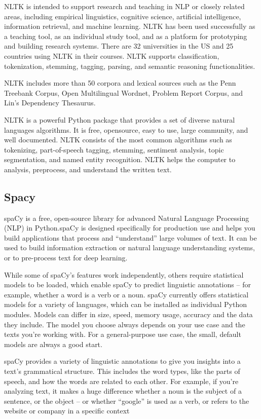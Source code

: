 \documentclass[12pt,a4paper,final]{extreport}
\begin{document}
NLTK is intended to support research and teaching in NLP or closely related areas, including empirical linguistics, cognitive science, artificial intelligence, information retrieval, and machine learning. NLTK has been used successfully as a teaching tool, as an individual study tool, and as a platform for prototyping and building research systems. There are 32 universities in the US and 25 countries using NLTK in their courses. NLTK supports classification, tokenization, stemming, tagging, parsing, and semantic reasoning functionalities. 

NLTK includes more than 50 corpora and lexical sources such as the Penn Treebank Corpus, Open Multilingual Wordnet, Problem Report Corpus, and Lin’s Dependency Thesaurus.

NLTK is a powerful Python package that provides a set of diverse natural languages algorithms. It is free, opensource, easy to use, large community, and well documented. NLTK consists of the most common algorithms such as tokenizing, part-of-speech tagging, stemming, sentiment analysis, topic segmentation, and named entity recognition. NLTK helps the computer to analysis, preprocess, and understand the written text.


\subsection{Spacy}
spaCy is a free, open-source library for advanced Natural Language Processing (NLP) in Python.spaCy is designed specifically for production use and helps you build applications that process and “understand” large volumes of text. It can be used to build information extraction or natural language understanding systems, or to pre-process text for deep learning.

While some of spaCy’s features work independently, others require statistical models to be loaded, which enable spaCy to predict linguistic annotations – for example, whether a word is a verb or a noun. spaCy currently offers statistical models for a variety of languages, which can be installed as individual Python modules. Models can differ in size, speed, memory usage, accuracy and the data they include. The model you choose always depends on your use case and the texts you’re working with. For a general-purpose use case, the small, default models are always a good start. 

spaCy provides a variety of linguistic annotations to give you insights into a text’s grammatical structure. This includes the word types, like the parts of speech, and how the words are related to each other. For example, if you’re analyzing text, it makes a huge difference whether a noun is the subject of a sentence, or the object – or whether “google” is used as a verb, or refers to the website or company in a specific context
\end{document}
